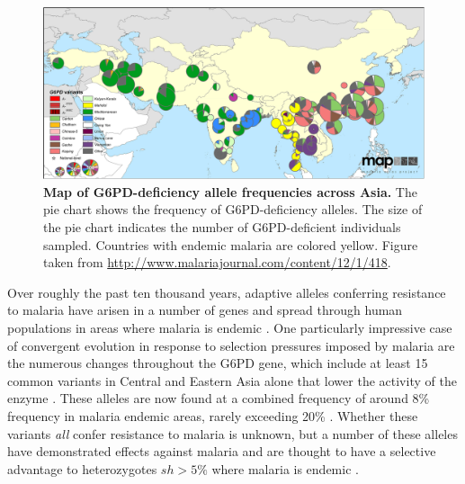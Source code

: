 {\begin{figure}
\begin{center}
  \includegraphics[width=0.9 \textwidth]{Journal_figs/drift_selection/G6PD/G6pd_Howes_et_al_1475-2875-12-418-4.png} 
\caption{ 
{\bf Map of G6PD-deficiency allele frequencies across Asia.} 
The pie chart shows the frequency of G6PD-deficiency alleles. 
The size of the pie chart indicates the number of G6PD-deficient individuals sampled.
Countries with endemic malaria are colored yellow. 
Figure taken from \citet{Howes-g6pd-variants}
\url{http://www.malariajournal.com/content/12/1/418}. 
} \label{fig-G6PD-map}
\end{center}
\end{figure}

Over roughly the past ten thousand years, adaptive alleles conferring resistance to malaria have arisen in a number of genes 
and spread through human populations in areas where malaria is endemic
\citep{Kwiatkowski:05}. One particularly impressive case of convergent evolution in response to
selection pressures imposed by malaria are the numerous changes
throughout the G6PD gene,
which include at least 15 common variants in Central and Eastern Asia alone that lower the activity of the
enzyme \citep{Howes-g6pd-variants}. 
These alleles are now found at a combined frequency of around 8\% frequency in malaria endemic areas,
rarely exceeding 20\% \citep{Howes-g6pd-preval}. Whether these variants {\it all} confer resistance to malaria is unknown,
but a number of these alleles have demonstrated effects against
malaria and are thought to have a selective advantage to heterozygotes $sh > 5\%$ where malaria is endemic \citep{Ruwende-g6pd,tishkoff-g6pd,Louicharoen-g6pd}. 

}
